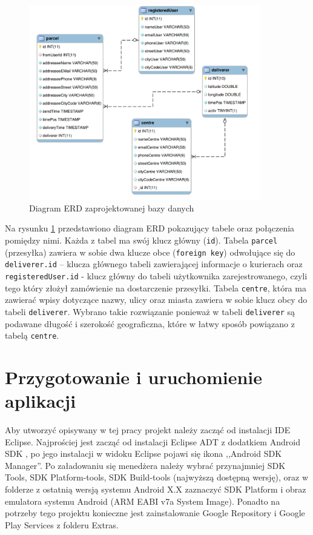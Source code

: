 \documentclass[eng,printmode,oneside]{mgr}
\begin{document}
\begin{figure}[ht!]
\centering
\includegraphics[width=0.9\textwidth]{ERD.png}
\caption{Diagram ERD zaprojektowanej bazy danych}
\label{fig:ERD}
\end{figure}

Na rysunku \ref{fig:ERD} przedstawiono diagram ERD pokazujący tabele oraz
połączenia pomiędzy nimi. Każda z tabel ma swój klucz główny (\texttt{id}).
Tabela \texttt{parcel} (przesyłka) zawiera w sobie dwa klucze obce
(\texttt{foreign key}) odwołujące się do \texttt{deliverer.id} -- klucza głównego
tabeli zawierającej informacje o kurierach oraz \texttt{registeredUser.id} -
klucz główny do tabeli użytkownika zarejestrowanego, czyli tego który złożył
zamówienie na dostarczenie przesyłki. Tabela \texttt{centre}, która ma zawierać
wpisy dotyczące nazwy, ulicy oraz miasta zawiera w sobie klucz obcy do tabeli
\texttt{deliverer}. Wybrano takie rozwiązanie ponieważ w tabeli
\texttt{deliverer} są podawane długość i szerokość geograficzna, które w łatwy sposób powiązano z tabelą \texttt{centre}.

\chapter{Przygotowanie i uruchomienie aplikacji}

Aby utworzyć opisywany w tej pracy projekt należy zacząć od instalacji IDE
Eclipse. Najprościej jest zacząć od instalacji Eclipse ADT z dodatkiem Android
SDK \cite{eclipse}, po jego instalacji w widoku Eclipse pojawi się ikona
,,Android SDK Manager''. Po załadowaniu się menedżera należy wybrać przynajmniej
SDK Tools, SDK Platform-tools, SDK Build-tools (najwyższą dostępną wersję), oraz w folderze z ostatnią wersją systemu Android X.X zaznaczyć SDK Platform i
obraz emulatora systemu Android (ARM EABI v7a System Image). Ponadto na
potrzeby tego projektu konieczne jest zainstalowanie Google Repository i Google
Play Services z folderu Extras.
\end{document}
